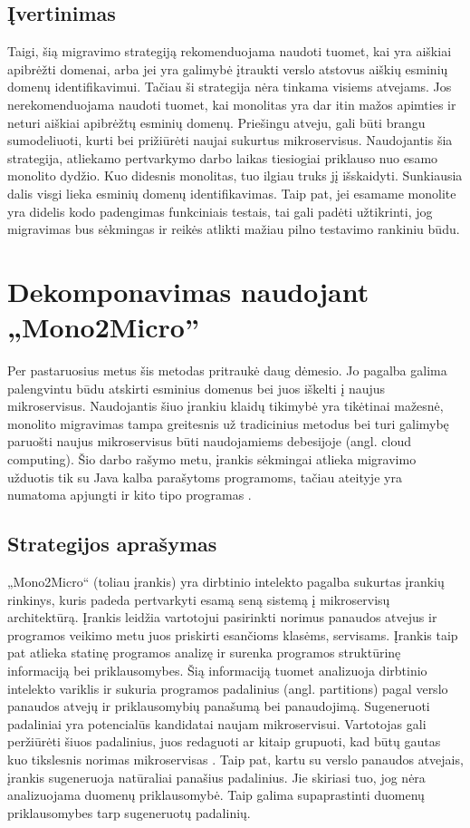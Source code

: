 \documentclass{VUMIFPSbakalaurinis}
\begin{document}
\subsection{Įvertinimas}
Taigi, šią migravimo strategiją rekomenduojama naudoti tuomet, kai yra aiškiai apibrėžti domenai, arba jei yra galimybė įtraukti verslo atstovus aiškių esminių domenų identifikavimui. Tačiau ši strategija nėra tinkama visiems atvejams. Jos nerekomenduojama naudoti tuomet, kai monolitas yra dar itin mažos apimties ir neturi aiškiai apibrėžtų esminių domenų. Priešingu atveju, gali būti brangu sumodeliuoti, kurti bei prižiūrėti naujai sukurtus mikroservisus. Naudojantis šia strategija, atliekamo pertvarkymo darbo laikas tiesiogiai priklauso nuo esamo monolito dydžio. Kuo didesnis monolitas, tuo ilgiau truks jį išskaidyti. Sunkiausia dalis visgi lieka esminių domenų identifikavimas. Taip pat, jei esamame monolite yra didelis kodo padengimas funkciniais testais, tai gali padėti užtikrinti, jog migravimas bus sėkmingas ir reikės atlikti mažiau pilno testavimo rankiniu būdu.

\section{Dekomponavimas naudojant „Mono2Micro”}
Per pastaruosius metus šis metodas pritraukė daug dėmesio. Jo pagalba galima palengvintu būdu atskirti esminius domenus bei juos iškelti į naujus mikroservisus. Naudojantis šiuo įrankiu klaidų tikimybė yra tikėtinai mažesnė, monolito migravimas tampa greitesnis už tradicinius metodus bei turi galimybę paruošti naujus mikroservisus būti naudojamiems debesijoje (angl. cloud computing). Šio darbo rašymo metu, įrankis sėkmingai atlieka migravimo užduotis tik su Java kalba parašytoms programoms, tačiau ateityje yra numatoma apjungti ir kito tipo programas \cite{KXL+20}.

\subsection{Strategijos aprašymas}
„Mono2Micro“ (toliau įrankis) yra dirbtinio intelekto pagalba sukurtas įrankių rinkinys, kuris padeda pertvarkyti esamą seną sistemą į mikroservisų architektūrą. Įrankis leidžia vartotojui pasirinkti norimus panaudos atvejus ir programos veikimo metu juos priskirti esančioms klasėms, servisams. Įrankis taip pat atlieka statinę programos analizę ir surenka programos struktūrinę informaciją bei priklausomybes. Šią informaciją tuomet analizuoja dirbtinio intelekto variklis ir sukuria programos padalinius (angl. partitions) pagal verslo panaudos atvejų ir priklausomybių panašumą bei panaudojimą. Sugeneruoti padaliniai yra potencialūs kandidatai naujam mikroservisui. Vartotojas gali peržiūrėti šiuos padalinius, juos redaguoti ar kitaip grupuoti, kad būtų gautas kuo tikslesnis norimas mikroservisas \cite{KXK+21}. Taip pat, kartu su verslo panaudos atvejais, įrankis sugeneruoja natūraliai panašius padalinius. Jie skiriasi tuo, jog nėra analizuojama duomenų priklausomybė. Taip galima supaprastinti duomenų priklausomybes tarp sugeneruotų padalinių.
\end{document}
